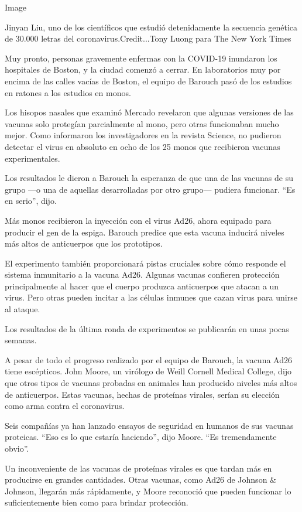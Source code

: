 Image

Jinyan Liu, uno de los científicos que estudió detenidamente la
secuencia genética de 30.000 letras del coronavirus.Credit...Tony Luong
para The New York Times

Muy pronto, personas gravemente enfermas con la COVID-19 inundaron los
hospitales de Boston, y la ciudad comenzó a cerrar. En laboratorios muy
por encima de las calles vacías de Boston, el equipo de Barouch pasó de
los estudios en ratones a los estudios en monos.

Los hisopos nasales que examinó Mercado revelaron que algunas versiones
de las vacunas solo protegían parcialmente al mono, pero otras
funcionaban mucho mejor. Como informaron los investigadores en la
revista Science, no pudieron detectar el virus en absoluto en ocho de
los 25 monos que recibieron vacunas experimentales.

Los resultados le dieron a Barouch la esperanza de que una de las
vacunas de su grupo ---o una de aquellas desarrolladas por otro grupo---
pudiera funcionar. ``Es en serio'', dijo.

Más monos recibieron la inyección con el virus Ad26, ahora equipado para
producir el gen de la espiga. Barouch predice que esta vacuna inducirá
niveles más altos de anticuerpos que los prototipos.

El experimento también proporcionará pistas cruciales sobre cómo
responde el sistema inmunitario a la vacuna Ad26. Algunas vacunas
confieren protección principalmente al hacer que el cuerpo produzca
anticuerpos que atacan a un virus. Pero otras pueden incitar a las
células inmunes que cazan virus para unirse al ataque.

Los resultados de la última ronda de experimentos se publicarán en unas
pocas semanas.

A pesar de todo el progreso realizado por el equipo de Barouch, la
vacuna Ad26 tiene escépticos. John Moore, un virólogo de Weill Cornell
Medical College, dijo que otros tipos de vacunas probadas en animales
han producido niveles más altos de anticuerpos. Estas vacunas, hechas de
proteínas virales, serían su elección como arma contra el coronavirus.

Seis compañías ya han lanzado ensayos de seguridad en humanos de sus
vacunas proteicas. ``Eso es lo que estaría haciendo'', dijo Moore. ``Es
tremendamente obvio''.

Un inconveniente de las vacunas de proteínas virales es que tardan más
en producirse en grandes cantidades. Otras vacunas, como Ad26 de Johnson
\& Johnson, llegarán más rápidamente, y Moore reconoció que pueden
funcionar lo suficientemente bien como para brindar protección.

